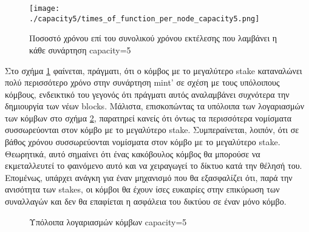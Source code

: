 \documentclass{article}
\newcommand{\eng}[1]{\foreignlanguage{english}{#1}} %
\begin{document}
\begin{figure}[ht]
    \centering
    \texttt{[image: ./capacity5/times\_of\_function\_per\_node\_capacity5.png]}
    \caption{Ποσοστό χρόνου επί του συνολικού χρόνου εκτέλεσης που λαμβάνει η κάθε συνάρτηση \eng{capacity=5}}
    \label{fig:fairness-funcs}
\end{figure}
\FloatBarrier

Στο σχήμα \ref{fig:fairness-funcs} φαίνεται, πράγματι, ότι ο κόμβος με το
μεγαλύτερο \eng{stake} καταναλώνει πολύ περισσότερο χρόνο στην συνάρτηση
\eng{mint'} σε σχέση με τους υπόλοιπους κόμβους, ενδεικτικό του γεγονός ότι
πράγματι αυτός αναλαμβάνει συχνότερα την δημιουργία των νέων \eng{blocks}.
Μάλιστα, επισκοπώντας τα υπόλοιπα των λογαριασμών των κόμβων στο σχήμα
\ref{fig:fairness-balances}, παρατηρεί κανείς ότι όντως τα περισσότερα
νομίσματα συσσωρεύονται στον κόμβο με το μεγαλύτερο \eng{stake}. Συμπεραίνεται,
λοιπόν, ότι σε βάθος χρόνου συσσωρεύονται νομίσματα στον κόμβο με το μεγαλύτερο
\eng{stake}. Θεωρητικά, αυτό σημαίνει ότι ένας κακόβουλος κόμβος θα μπορούσε
να εκμεταλλευτεί το φαινόμενο αυτό και να χειραγωγεί το δίκτυο κατά την
θέλησή του. Επομένως, υπάρχει ανάγκη για έναν μηχανισμό που θα εξασφαλίζει
ότι, παρά την ανισότητα των \eng{stakes}, οι κόμβοι θα έχουν ίσες ευκαιρίες
στην επικύρωση των συναλλαγών και δεν θα επαφίεται η ασφάλεια του δικτύου
σε έναν μόνο κόμβο.

\begin{figure}[h]
    \centering    
    \begin{varwidth}{\linewidth}
        
    \end{varwidth}
    \caption{Υπόλοιπα λογαριασμών κόμβων \eng{capacity=5}}
    \label{fig:fairness-balances}
\end{figure}
\end{document}

